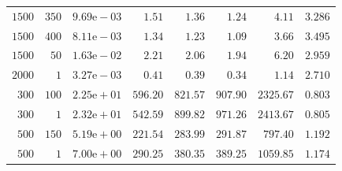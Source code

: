 \begin{table}
{\begin{tabular}{rrlrrrrr}
    $1500$ & $350$ & $9.69\text{e}-03$ & $1.51$ & $1.36$ & $1.24$ & $4.11$ & $3.286$ \\
    $1500$ & $400$ & $8.11\text{e}-03$ & $1.34$ & $1.23$ & $1.09$ & $3.66$ & $3.495$ \\
    $1500$ & $50$ & $1.63\text{e}-02$ & $2.21$ & $2.06$ & $1.94$ & $6.20$ & $2.959$ \\
    $2000$ & $1$ & $3.27\text{e}-03$ & $0.41$ & $0.39$ & $0.34$ & $1.14$ & $2.710$ \\
    $300$ & $100$ & $2.25\text{e}+01$ & $596.20$ & $821.57$ & $907.90$ & $2325.67$ & $0.803$ \\
    $300$ & $1$ & $2.32\text{e}+01$ & $542.59$ & $899.82$ & $971.26$ & $2413.67$ & $0.805$ \\
    $500$ & $150$ & $5.19\text{e}+00$ & $221.54$ & $283.99$ & $291.87$ & $797.40$ & $1.192$ \\
    $500$ & $1$ & $7.00\text{e}+00$ & $290.25$ & $380.35$ & $389.25$ & $1059.85$ & $1.174$ \\


\end{tabular}}
\end{table}
